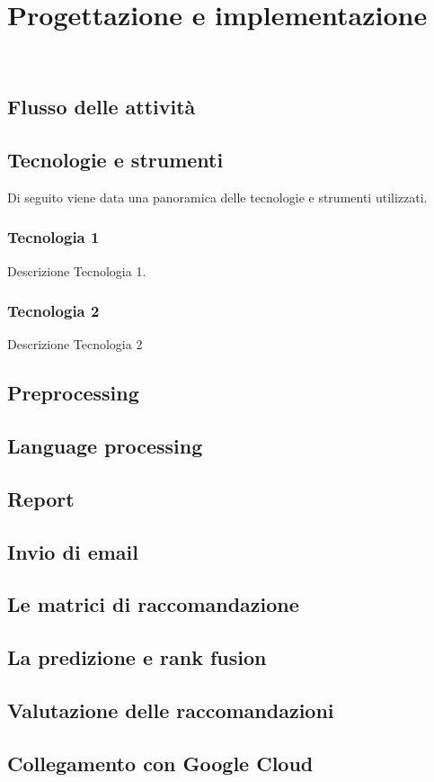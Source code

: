 \chapter{Progettazione e implementazione}
\label{cap:progettazione-implementazione}

\\

\section{Flusso delle attività}


\section{Tecnologie e strumenti}
\label{sec:tecnologie-strumenti}

Di seguito viene data una panoramica delle tecnologie e strumenti utilizzati.

\subsection{Tecnologia 1}
Descrizione Tecnologia 1.

\subsection{Tecnologia 2}
Descrizione Tecnologia 2


\section{Preprocessing}

\section{Language processing}

\section{Report}

\section{Invio di email}

\section{Le matrici di raccomandazione}

\section{La predizione e rank fusion}

\section{Valutazione delle raccomandazioni}

\section{Collegamento con Google Cloud}
